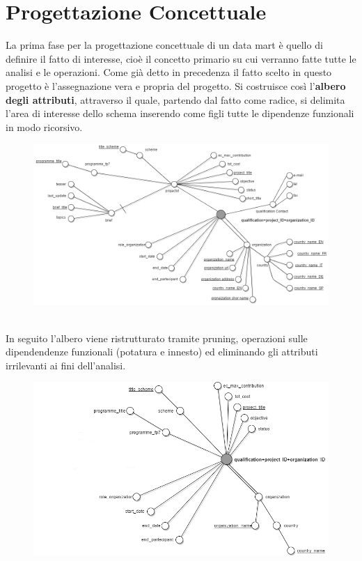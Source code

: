 \documentclass[12pt,a4paper]{report}
\begin{document}
\section*{Progettazione Concettuale}
La prima fase per la progettazione concettuale di un data mart è quello di definire il fatto di interesse, cioè il concetto primario su cui verranno fatte tutte le analisi e le operazioni. Come già detto in precedenza il fatto scelto in questo progetto è l'assegnazione vera e propria del progetto. 
Si costruisce così l'\textbf{albero degli attributi}, attraverso il
quale, partendo dal fatto come radice, si delimita l'area di interesse dello schema inserendo come figli tutte le dipendenze funzionali in modo ricorsivo.
\begin{figure}[htbp]
	\centering
	\includegraphics[scale=0.40]{attribute-tree}
\end{figure}
\\In seguito l'albero viene ristrutturato tramite pruning, operazioni sulle dipendendenze funzionali (potatura e innesto) ed eliminando gli attributi irrilevanti ai fini dell'analisi.
\begin{figure}[htbp]
	\centering
	\includegraphics[scale=0.40]{attribute-tree-final}
\end{figure}
\end{document}
